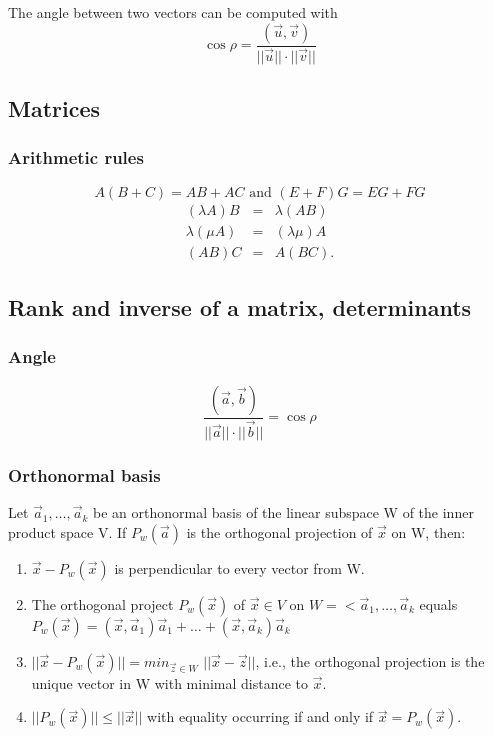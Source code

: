 \documentclass{article}
\begin{document}
		The angle between two vectors can be computed with
		\begin{equation*}
			\cos{\rho} = \frac{(\vec{u}, \vec{v})}{||\vec{u}||\cdot||\vec{v}||}
		\end{equation*}
	
		\subsection{Matrices}
			\subsubsection{Arithmetic rules}
			\begin{equation*}
				A(B+C) = AB+AC \text{ and } (E+F)G = EG+FG
			\end{equation*}
			\begin{eqnarray*}
				(\lambda A)B &=& \lambda(AB) \\
				\lambda(\mu A) &=& (\lambda\mu)A \\
				(AB)C &=& A(BC).
			\end{eqnarray*}
		
		\subsection{Rank and inverse of a matrix, determinants}
			\subsubsection{Angle}
				\begin{equation*}
					\frac{(\vec{a}, \vec{b})}{||\vec{a}||\cdot||\vec{b}||} = \cos{\rho}
				\end{equation*}
			\subsubsection{Orthonormal basis}
			Let $\vec{a}_1,\dots,\vec{a}_k$ be an orthonormal basis of the linear subspace W of the inner product space V. If $P_w(\vec{a})$ is the orthogonal projection of $\vec{x}$ on W, then:
			\begin{enumerate}
				\item $\vec{x} - P_w(\vec{x})$ is perpendicular to every vector from W.
				\item The orthogonal project $P_w(\vec{x})$ of $\vec{x} \in V$ on $W = <\vec{a}_1,\dots,\vec{a}_k$ equals $P_w(\vec{x}) = (\vec{x},\vec{a}_1)\vec{a}_1 + \dots + (\vec{x},\vec{a}_k)\vec{a}_k$
				\item $||\vec{x} - P_w(\vec{x})|| = min_{\vec{z} \in W}$ $||\vec{x} - \vec{z}||$, i.e., the orthogonal projection is the unique vector in W with minimal distance to $\vec{x}$.
				\item $||P_w(\vec{x})|| \leq ||\vec{x}||$ with equality occurring if and only if $\vec{x} = P_w(\vec{x}).$
			\end{enumerate}
		
\end{document}
